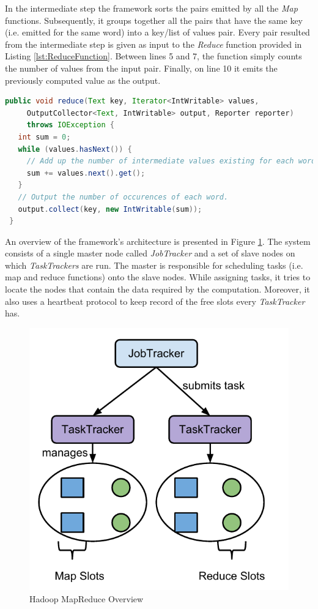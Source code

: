 \documentclass[11pt,a4paper,twoside]{report}
\begin{document}
In the intermediate step the framework sorts the pairs emitted by all the \textit{Map} functions. Subsequently, it groups together all the pairs that have the same key (i.e. emitted for the same word) into a key/list of values pair. Every pair resulted from the intermediate step is given as input to the \textit{Reduce} function provided in Listing \ref{lst:ReduceFunction}. Between lines 5 and 7, the function simply counts the number of values from the input pair. Finally, on line 10 it emits the previously computed value as the output.\\

\begin{lstlisting}[language=Java,caption={Word Count Reduce Function},
label={lst:ReduceFunction}]
 public void reduce(Text key, Iterator<IntWritable> values,
     OutputCollector<Text, IntWritable> output, Reporter reporter)
     throws IOException {
   int sum = 0;
   while (values.hasNext()) {
     // Add up the number of intermediate values existing for each word.
     sum += values.next().get();
   }
   // Output the number of occurences of each word.
   output.collect(key, new IntWritable(sum));
 }
\end{lstlisting}


An overview of the framework's architecture is presented in Figure \ref{fig:HadoopMR}. The system consists of a single master node called \textit{JobTracker} and a set of slave nodes on which \textit{TaskTrackers} are run. The master is responsible for scheduling tasks (i.e. map and reduce functions) onto the slave nodes. While assigning tasks, it tries to locate the nodes that contain the data required by the computation. Moreover, it also uses a heartbeat protocol to keep record of the free slots every \textit{TaskTracker} has.

\begin{figure}[h]
\centering
\includegraphics[scale=0.8]{HadoopMR}
\caption{Hadoop MapReduce Overview}
\label{fig:HadoopMR}
\end{figure}
\end{document}
